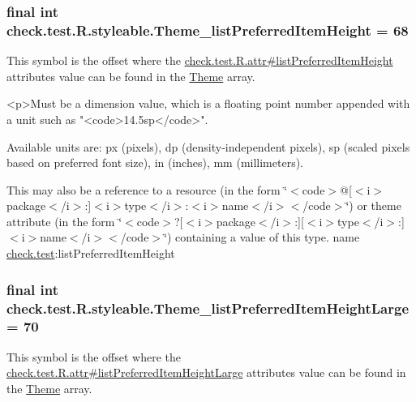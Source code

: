 \subsubsection[{Theme\+\_\+list\+Preferred\+Item\+Height}]{\setlength{\rightskip}{0pt plus 5cm}final int check.\+test.\+R.\+styleable.\+Theme\+\_\+list\+Preferred\+Item\+Height = 68\hspace{0.3cm}{\ttfamily [static]}}\label{classcheck_1_1test_1_1_r_1_1styleable_ab8d78a772c83aad6fa1b020d5f846f67}
This symbol is the offset where the \hyperlink{classcheck_1_1test_1_1_r_1_1attr_a52420e9bc7b9f17c46ea9db6ff438295}{check.\+test.\+R.\+attr\#list\+Preferred\+Item\+Height} attribute\textquotesingle{}s value can be found in the \hyperlink{classcheck_1_1test_1_1_r_1_1styleable_acca726d02016a0cf607782ec3a436a81}{Theme} array.

\begin{DoxyVerb}      <p>Must be a dimension value, which is a floating point number appended with a unit such as "<code>14.5sp</code>".
\end{DoxyVerb}
 Available units are\+: px (pixels), dp (density-\/independent pixels), sp (scaled pixels based on preferred font size), in (inches), mm (millimeters). 

This may also be a reference to a resource (in the form \char`\"{}$<$code$>$@\mbox{[}$<$i$>$package$<$/i$>$\+:\mbox{]}$<$i$>$type$<$/i$>$\+:$<$i$>$name$<$/i$>$$<$/code$>$\char`\"{}) or theme attribute (in the form \char`\"{}$<$code$>$?\mbox{[}$<$i$>$package$<$/i$>$\+:\mbox{]}\mbox{[}$<$i$>$type$<$/i$>$\+:\mbox{]}$<$i$>$name$<$/i$>$$<$/code$>$\char`\"{}) containing a value of this type.  name \hyperlink{namespacecheck_1_1test}{check.\+test}\+:list\+Preferred\+Item\+Height \hypertarget{classcheck_1_1test_1_1_r_1_1styleable_a6b792de713c77b5d2897ffd143ea5d6a}{}
\subsubsection[{Theme\+\_\+list\+Preferred\+Item\+Height\+Large}]{\setlength{\rightskip}{0pt plus 5cm}final int check.\+test.\+R.\+styleable.\+Theme\+\_\+list\+Preferred\+Item\+Height\+Large = 70\hspace{0.3cm}{\ttfamily [static]}}\label{classcheck_1_1test_1_1_r_1_1styleable_a6b792de713c77b5d2897ffd143ea5d6a}
This symbol is the offset where the \hyperlink{classcheck_1_1test_1_1_r_1_1attr_aabce9b732bbded79dc2e9a7fe1c57972}{check.\+test.\+R.\+attr\#list\+Preferred\+Item\+Height\+Large} attribute\textquotesingle{}s value can be found in the \hyperlink{classcheck_1_1test_1_1_r_1_1styleable_acca726d02016a0cf607782ec3a436a81}{Theme} array.

